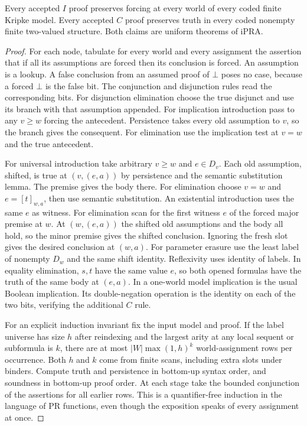 \begin{theorem}\label{thm:krip-check}
Every accepted $I$ proof preserves forcing at every world of every
coded finite Kripke model. Every accepted $C$ proof preserves truth in
every coded nonempty finite two-valued structure. Both claims are
uniform theorems of iPRA.
\end{theorem}
\begin{proof}
For each node, tabulate for every world and every assignment the assertion
that if all its assumptions are forced then its conclusion is forced.
An assumption is a lookup. A false conclusion from an assumed proof of
$\bot$ poses no case, because a forced $\bot$ is the false bit. The
conjunction and disjunction rules read the corresponding bits. For
disjunction elimination choose the true disjunct and use its branch with
that assumption appended. For implication introduction pass to any $v\ge w$
forcing the antecedent. Persistence takes every old assumption to $v$,
so the branch gives the consequent. For elimination use the implication
test at $v=w$ and the true antecedent.

For universal introduction take arbitrary $v\ge w$ and $e\in D_v$.
Each old assumption, shifted, is true at $(v,(e,a))$ by persistence and
the semantic substitution lemma. The premise gives the body there.
For elimination choose $v=w$ and $e=[t]_{w,a}$, then use semantic
substitution. An existential introduction uses the same $e$ as witness.
For elimination scan for the first witness $e$ of the forced major premise
at $w$. At $(w,(e,a))$ the shifted old assumptions and the body all hold,
so the minor premise gives the shifted conclusion. Ignoring the fresh
slot gives the desired conclusion at $(w,a)$. For parameter erasure
use the least label of nonempty $D_w$ and the same shift identity.
Reflexivity uses identity of labels. In equality elimination, $s,t$
have the same value $e$, so both opened formulas have the truth of the
same body at $(e,a)$. In a one-world model implication is the usual
Boolean implication. Its double-negation operation is the identity
on each of the two bits, verifying the additional $C$ rule.

For an explicit induction invariant fix the input model and proof.
If the label universe has size $h$ after reindexing and the largest
arity at any local sequent or subformula is $k$, there are at most
$|W|\max(1,h)^k$ world-assignment rows per occurrence. Both $h$ and
$k$ come from finite scans, including extra slots under binders.
Compute truth and persistence in bottom-up syntax order, and soundness
in bottom-up proof order. At each stage take the bounded conjunction of
the assertions for all earlier rows. This is a quantifier-free induction
in the language of PR functions, even though the exposition speaks of
every assignment at once.
\end{proof}

